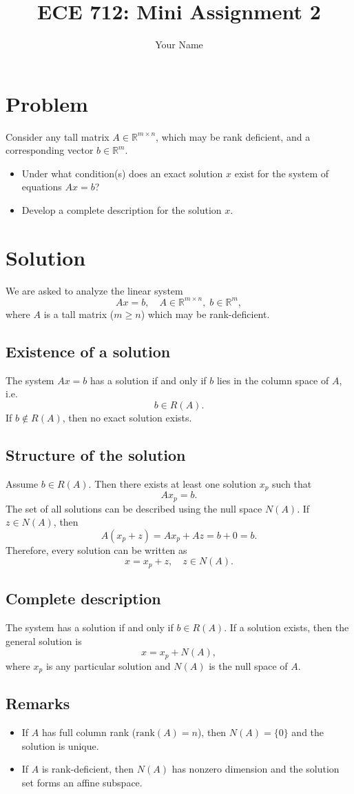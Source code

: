 \documentclass[12pt]{article}
\title{ECE 712: Mini Assignment 2}
\author{Your Name}
\date{}
\begin{document}
\maketitle

\section*{Problem}
Consider any tall matrix $A \in \mathbb{R}^{m \times n}$, which may be rank deficient, and a corresponding vector $b \in \mathbb{R}^m$.

\begin{itemize}
    \item Under what condition(s) does an exact solution $x$ exist for the system of equations $Ax = b$?
    \item Develop a complete description for the solution $x$. 
\end{itemize}

\section*{Solution}

We are asked to analyze the linear system
\[
A x = b, \quad A \in \mathbb{R}^{m \times n}, \; b \in \mathbb{R}^m,
\]
where $A$ is a tall matrix ($m \geq n$) which may be rank-deficient.

\subsection*{Existence of a solution}
The system $Ax = b$ has a solution if and only if $b$ lies in the column space of $A$, i.e.
\[
b \in R(A).
\]
If $b \notin R(A)$, then no exact solution exists.

\subsection*{Structure of the solution}
Assume $b \in R(A)$. Then there exists at least one solution $x_p$ such that
\[
A x_p = b.
\]
The set of all solutions can be described using the null space $N(A)$.  
If $z \in N(A)$, then
\[
A(x_p + z) = A x_p + A z = b + 0 = b.
\]
Therefore, every solution can be written as
\[
x = x_p + z, \quad z \in N(A).
\]

\subsection*{Complete description}
The system has a solution if and only if $b \in R(A)$.  
If a solution exists, then the general solution is
\[
x = x_p + N(A),
\]
where $x_p$ is any particular solution and $N(A)$ is the null space of $A$.

\subsection*{Remarks}
\begin{itemize}
    \item If $A$ has full column rank ($\text{rank}(A) = n$), then $N(A) = \{0\}$ and the solution is unique.
    \item If $A$ is rank-deficient, then $N(A)$ has nonzero dimension and the solution set forms an affine subspace.
\end{itemize}
\end{document}
